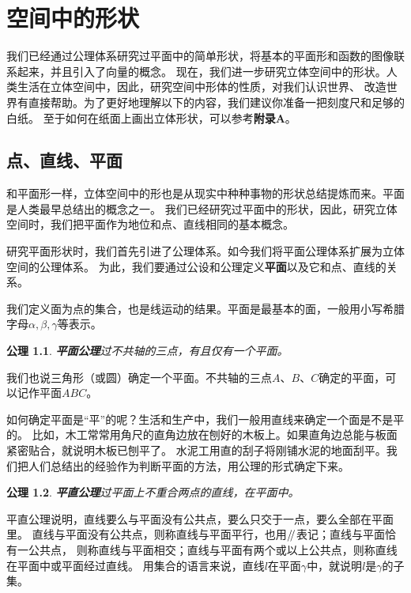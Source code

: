 \documentclass[12pt,UTF8]{ctexbook}
\newtheorem{po}{公理}
\renewcommand\parallel{\mathrel{/\mskip-4mu/}}
\begin{document}
\chapter{空间中的形状}

我们已经通过公理体系研究过平面中的简单形状，将基本的平面形和函数的图像联系起来，并且引入了向量的概念。
现在，我们进一步研究立体空间中的形状。人类生活在立体空间中，因此，研究空间中形体的性质，对我们认识世界、
改造世界有直接帮助。为了更好地理解以下的内容，我们建议你准备一把刻度尺和足够的白纸。
至于如何在纸面上画出立体形状，可以参考\textbf{附录A}。

\section{点、直线、平面}

和平面形一样，立体空间中的形也是从现实中种种事物的形状总结提炼而来。平面是人类最早总结出的概念之一。
我们已经研究过平面中的形状，因此，研究立体空间时，我们把平面作为地位和点、直线相同的基本概念。

研究平面形状时，我们首先引进了公理体系。如今我们将平面公理体系扩展为立体空间的公理体系。
为此，我们要通过公设和公理定义\textbf{平面}以及它和点、直线的关系。

我们定义面为点的集合，也是线运动的结果。平面是最基本的面，一般用小写希腊字母$\alpha,\beta,\gamma$等表示。
\begin{po}{\textbf{平面公理}}\label{po:0}
    过不共轴的三点，有且仅有一个平面。
\end{po}

我们也说三角形（或圆）确定一个平面。不共轴的三点$A$、$B$、$C$确定的平面，可以记作平面$ABC$。

如何确定平面是“平”的呢？生活和生产中，我们一般用直线来确定一个面是不是平的。
比如，木工常常用角尺的直角边放在刨好的木板上。如果直角边总能与板面紧密贴合，就说明木板已刨平了。
水泥工用直的刮子将刚铺水泥的地面刮平。我们把人们总结出的经验作为判断平面的方法，用公理的形式确定下来。
\begin{po}{\textbf{平直公理}}\label{po:1}
    过平面上不重合两点的直线，在平面中。
\end{po}
平直公理说明，直线要么与平面没有公共点，要么只交于一点，要么全部在平面里。
直线与平面没有公共点，则称直线与平面平行，也用$\parallel$表记；直线与平面恰有一公共点，
则称直线与平面相交；直线与平面有两个或以上公共点，则称直线在平面中或平面经过直线。
用集合的语言来说，直线$l$在平面$\gamma$中，就说明$l$是$\gamma$的子集。

\end{document}

